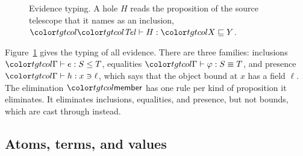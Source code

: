 \begin{figure}
\color{black}
\caption{Evidence typing. A hole $H$ reads the proposition of the source telescope that it names as an inclusion, $\holej{\tel}{H}{X}{Y}$.}
\label{fig:evidence}
\end{figure}

Figure~\ref{fig:evidence} gives the typing of all evidence. There are three families: inclusions $\lej{\Gamma}{e}{S}{T}$, equalities $\eqj{\Gamma}{\varphi}{S}{T}$, and presence $\hasj{\Gamma}{h}{x}{\ell}$, which says that the object bound at $x$ has a field $\ell$. The elimination $\ev{member}$ has one rule per kind of proposition it eliminates. It eliminates inclusions, equalities, and presence, but not bounds, which are cast through instead.

\subsection{Atoms, terms, and values}\label{sec:atoms}

